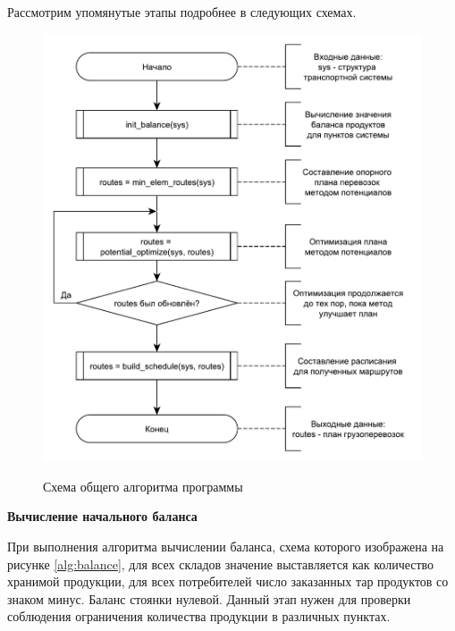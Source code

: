 Рассмотрим упомянутые этапы подробнее в следующих схемах.

\pagebreak
\begin{figure}[h]
	\begin{center}
		{\includegraphics[scale=0.7, angle=0, page=1]{img/main_algorithm.pdf}}
		\caption{Схема общего алгоритма программы}
		\label{alg:main}
	\end{center}
\end{figure}

\textbf{Вычисление начального баланса}

При выполнения алгоритма вычислении баланса, схема которого изображена на рисунке \ref{alg:balance}, для всех складов значение выставляется как количество хранимой продукции, для всех потребителей число заказанных тар продуктов со знаком минус. Баланс стоянки нулевой. Данный этап нужен для проверки соблюдения ограничения количества продукции в различных пунктах. 

